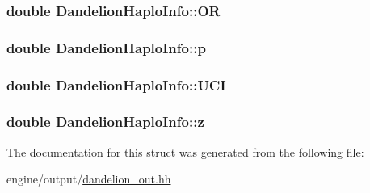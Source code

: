 \label{structDandelionHaploInfo_a816709cc46ab54a0a6afe7e5e48d9a22}
\hypertarget{structDandelionHaploInfo_a1342df0d3256a2378be3f3512810bce4}{
\subsubsection[{OR}]{\setlength{\rightskip}{0pt plus 5cm}double {\bf DandelionHaploInfo::OR}}}
\label{structDandelionHaploInfo_a1342df0d3256a2378be3f3512810bce4}
\hypertarget{structDandelionHaploInfo_a987c710ff44dec51b853659f5b5450f1}{
\subsubsection[{p}]{\setlength{\rightskip}{0pt plus 5cm}double {\bf DandelionHaploInfo::p}}}
\label{structDandelionHaploInfo_a987c710ff44dec51b853659f5b5450f1}
\hypertarget{structDandelionHaploInfo_a797db41ac3fb4e6360ec3e20cafe5999}{
\subsubsection[{UCI}]{\setlength{\rightskip}{0pt plus 5cm}double {\bf DandelionHaploInfo::UCI}}}
\label{structDandelionHaploInfo_a797db41ac3fb4e6360ec3e20cafe5999}
\hypertarget{structDandelionHaploInfo_a3121158a7720b61247ecbc6e13b4c389}{
\subsubsection[{z}]{\setlength{\rightskip}{0pt plus 5cm}double {\bf DandelionHaploInfo::z}}}
\label{structDandelionHaploInfo_a3121158a7720b61247ecbc6e13b4c389}


The documentation for this struct was generated from the following file:\begin{DoxyCompactItemize}
\item 
engine/output/\hyperlink{dandelion__out_8hh}{dandelion\_\-out.hh}\end{DoxyCompactItemize}
